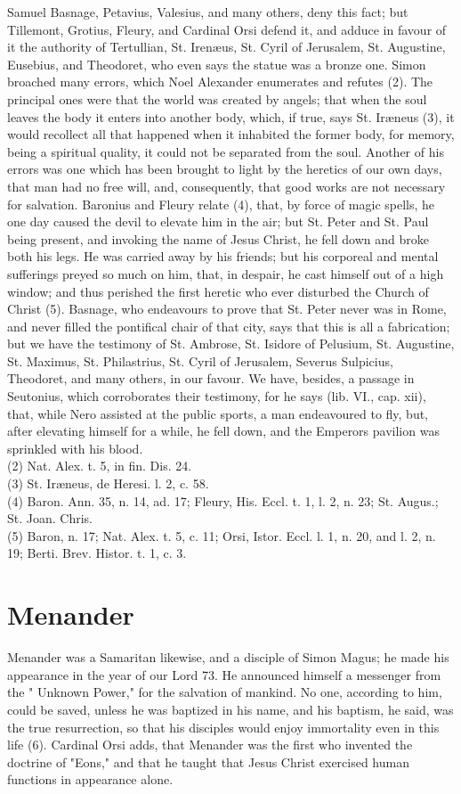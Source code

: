 \documentclass[12pt]{book}
\begin{document}
Samuel Basnage, Petavius, Valesius, and many others, deny this fact; but Tillemont, Grotius, Fleury, and
Cardinal Orsi defend it, and adduce in favour of it the authority of Tertullian, St. Irenæus, St. Cyril of
Jerusalem, St. Augustine, Eusebius, and Theodoret, who even says the statue was a bronze one. Simon
broached many errors, which Noel Alexander enumerates and refutes (2). The principal ones were that
the world was created by angels; that when the soul leaves the body it enters into another body, which, if
true, says St. Iræneus (3), it would recollect all that happened when it inhabited the former body, for
memory, being a spiritual quality, it could not be separated from the soul. Another of his errors was one
which has been brought to light by the heretics of our own days, that man had no free will, and,
consequently, that good works are not necessary for salvation. Baronius and Fleury relate (4), that, by
force of magic spells, he one day caused the devil to elevate him in the air; but St. Peter and St. Paul being
present, and invoking the name of Jesus Christ, he fell down and broke both his legs. He was carried
away by his friends; but his corporeal and mental sufferings preyed so much on him, that, in despair, he
cast himself out of a high window; and thus perished the first heretic who ever disturbed the Church of
Christ (5). Basnage, who endeavours to prove that St. Peter never was in Rome, and never filled the
pontifical chair of that city, says that this is all a fabrication; but we have the testimony of St. Ambrose, St.
Isidore of Pelusium, St. Augustine, St. Maximus, St. Philastrius, St. Cyril of Jerusalem, Severus Sulpicius,
Theodoret, and many others, in our favour. We have, besides, a passage in Seutonius, which corroborates
their testimony, for he says (lib. VI., cap. xii), that, while Nero assisted at the public sports, a man
endeavoured to fly, but, after elevating himself for a while, he fell down, and the Emperors pavilion was
sprinkled with his blood.\\
(2) Nat. Alex. t. 5, in fin. Dis. 24.\\
(3) St. Iræneus, de Heresi. l. 2, c. 58.\\
(4) Baron. Ann. 35, n. 14, ad. 17; Fleury, His. Eccl. t. 1, l. 2, n. 23; St. Augus.; St. Joan. Chris.\\
(5) Baron, n. 17; Nat. Alex. t. 5, c. 11; Orsi, Istor. Eccl. l. 1, n. 20, and l. 2, n. 19; Berti. Brev. Histor. t. 1, c. 3.
\section{Menander}
Menander was a Samaritan likewise, and a disciple of Simon Magus; he made his appearance in the
year of our Lord 73. He announced himself a messenger from the " Unknown Power," for the salvation of
mankind. No one, according to him, could be saved, unless he was baptized in his name, and his baptism,
he said, was the true resurrection, so that his disciples would enjoy immortality even in this life (6).
Cardinal Orsi adds, that Menander was the first who invented the doctrine of "Eons," and that he taught
that Jesus Christ exercised human functions in appearance alone.
\end{document}

